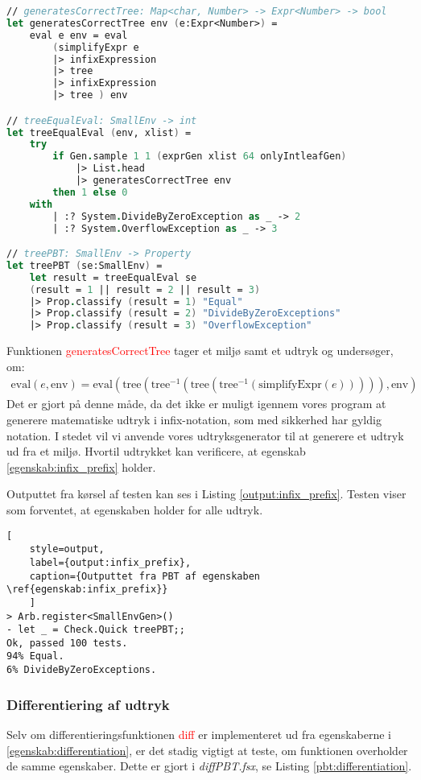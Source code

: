 \begin{lstlisting}[language={FSharp}, caption={PBT af egenskaben \ref{egenskab:infix_prefix}}, label={pbt:infix_prefix}]
// generatesCorrectTree: Map<char, Number> -> Expr<Number> -> bool
let generatesCorrectTree env (e:Expr<Number>) =
    eval e env = eval 
        (simplifyExpr e 
        |> infixExpression 
        |> tree 
        |> infixExpression 
        |> tree ) env

// treeEqualEval: SmallEnv -> int
let treeEqualEval (env, xlist) =
    try 
        if Gen.sample 1 1 (exprGen xlist 64 onlyIntleafGen) 
            |> List.head 
            |> generatesCorrectTree env 
        then 1 else 0
    with
        | :? System.DivideByZeroException as _ -> 2
        | :? System.OverflowException as _ -> 3

// treePBT: SmallEnv -> Property
let treePBT (se:SmallEnv) =
    let result = treeEqualEval se
    (result = 1 || result = 2 || result = 3)
    |> Prop.classify (result = 1) "Equal"
    |> Prop.classify (result = 2) "DivideByZeroExceptions"
    |> Prop.classify (result = 3) "OverflowException"
\end{lstlisting}

Funktionen \textcolor{red}{generatesCorrectTree} tager et miljø samt et udtryk og undersøger, om:
\begin{gather*}
    \text{eval}(e, \text{env}) = \text{eval}(\text{tree}(\text{tree}^{-1}(\text{tree}(\text{tree}^{-1}(\text{simplifyExpr}(e))))), \text{env})
\end{gather*}
Det er gjort på denne måde, da det ikke er muligt igennem vores program at generere matematiske udtryk i infix-notation, som med sikkerhed har gyldig notation. I stedet vil vi anvende vores udtryksgenerator til at generere et udtryk ud fra et miljø. Hvortil udtrykket kan verificere, at egenskab \ref{egenskab:infix_prefix} holder.

Outputtet fra kørsel af testen kan ses i Listing \ref{output:infix_prefix}. Testen viser som forventet, at egenskaben holder for alle udtryk.
\begin{lstlisting}[
    style=output, 
    label={output:infix_prefix}, 
    caption={Outputtet fra PBT af egenskaben \ref{egenskab:infix_prefix}}
    ]
> Arb.register<SmallEnvGen>()                               
- let _ = Check.Quick treePBT;;
Ok, passed 100 tests.
94% Equal.
6% DivideByZeroExceptions.
\end{lstlisting}


\subsubsection{Differentiering af udtryk}\label{sec:PBT_differentiation}
Selv om differentieringsfunktionen \textcolor{red}{diff} er implementeret ud fra egenskaberne i \ref{egenskab:differentiation}, er det stadig vigtigt at teste, om funktionen overholder de samme egenskaber. Dette er gjort i \textit{diffPBT.fsx}, se Listing \ref{pbt:differentiation}.

